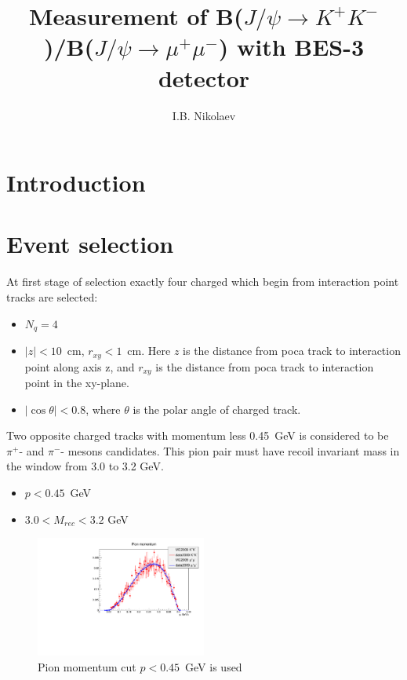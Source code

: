 \documentclass[a4paper,12pt]{article}
\title{Measurement of B($J/\psi \to K^+K^-$)/B($J/\psi \to \mu^+\mu^-$)
with BES-3 detector}
\author{I.B. Nikolaev}
\begin{document}
\maketitle

\section{Introduction}

\section{Event selection}

At first stage of selection exactly four  charged which begin from interaction point tracks are selected:
\begin{itemize}
	\item $N_q = 4$
	\item $|z| <  10$~cm,  $r_{xy} < 1$~cm. Here $z$ is the distance from poca track to interaction point along axis z, 
		and $r_{xy}$ is the distance from poca track to interaction point in the xy-plane.
	\item $|\cos{\theta}|<0.8$, where $\theta$ is the polar angle of charged track.
\end{itemize}


Two opposite charged tracks with momentum less 0.45~GeV is considered to be
$\pi^+$- and $\pi^-$- mesons candidates. This pion pair must have recoil
invariant mass in the window from 3.0 to 3.2 GeV.
\begin{itemize}
	\item $p<0.45$~GeV
	\item $3.0 < M_{rec} < 3.2$ GeV
\end{itemize}

\begin{figure}
\begin{center}
  \includegraphics[width=0.5\textwidth]{fig/pion_momentum.pdf}
  \caption{Pion momentum cut $p<0.45$~GeV is used}
\end{center}
\end{figure}
\end{document}
